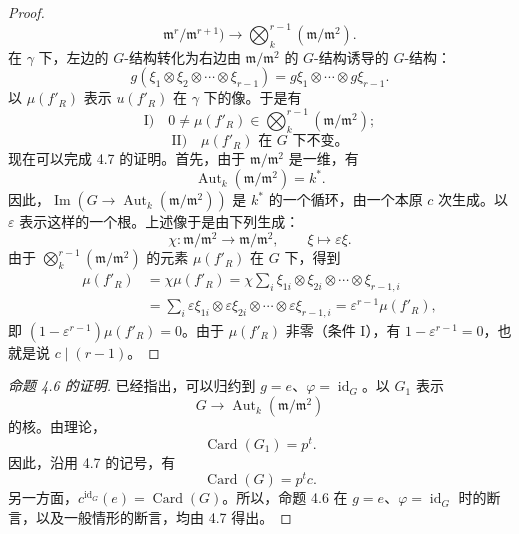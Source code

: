 \begin{proof}
\[ \mathfrak m^r/\mathfrak m^{r+1})
\longrightarrow\bigotimes_k^{r-1}(\mathfrak m/\mathfrak m^2).
\]
在 $\gamma$ 下，左边的 $G$-结构转化为右边由 $\mathfrak m/\mathfrak m^2$ 的 $G$-结构诱导的 $G$-结构：
\[
g(\xi_1\otimes\xi_2\otimes\cdots\otimes\xi_{r-1})
=g\xi_1\otimes\cdots\otimes g\xi_{r-1}.
\]
以 $\mu(f'_R)$ 表示 $u(f'_R)$ 在 $\gamma$ 下的像。于是有
\[
\text{I)}\quad0\ne\mu(f'_R)\in\bigotimes_k^{r-1}(\mathfrak m/\mathfrak m^2);
\]
\[
\text{II)}\quad\mu(f'_R)\text{ 在 }G\text{ 下不变。}
\]
现在可以完成 4.7 的证明。首先，由于 $\mathfrak m/\mathfrak m^2$ 是一维，有
\[
\operatorname{Aut}_k(\mathfrak m/\mathfrak m^2)=k^*.
\]
因此，$\operatorname{Im}(G\longrightarrow\operatorname{Aut}_k(\mathfrak m/\mathfrak m^2))$
是 $k^*$ 的一个循环，由一个本原 $c$ 次生成。以 $\varepsilon$ 表示这样的一个根。上述像于是由下列生成：
\[
\chi:\mathfrak m/\mathfrak m^2\longrightarrow\mathfrak m/\mathfrak m^2,
\qquad\xi\longmapsto\varepsilon\xi.
\]
由于 $\bigotimes_k^{r-1}(\mathfrak m/\mathfrak m^2)$ 的元素 $\mu(f'_R)$ 在 $G$ 下，得到
\[
\begin{aligned}
\mu(f'_R)&=\chi\mu(f'_R)
 =\chi\sum_i\xi_{1i}\otimes\xi_{2i}\otimes\cdots\otimes\xi_{r-1,i}\\
 &=\sum_i\varepsilon\xi_{1i}\otimes\varepsilon\xi_{2i}
   \otimes\cdots\otimes\varepsilon\xi_{r-1,i}
 =\varepsilon^{r-1}\mu(f'_R),
\end{aligned}
\]
即 $(1-\varepsilon^{r-1})\mu(f'_R)=0$。由于 $\mu(f'_R)$ 非零（条件 I），有
$1-\varepsilon^{r-1}=0$，也就是说 $c\mid(r-1)$。
\end{proof}

\begin{proof}[命题 4.6 的证明]
已经指出，可以归约到 $g=e$、$\varphi=\operatorname{id}_G$。以 $G_1$ 表示
\[
G\longrightarrow\operatorname{Aut}_k(\mathfrak m/\mathfrak m^2)
\]
的核。由理论，
\[
\operatorname{Card}(G_1)=p^t.
\]
因此，沿用 4.7 的记号，有
\[
\operatorname{Card}(G)=p^t c.
\]
另一方面，$c^{\operatorname{id}_G}(e)=\operatorname{Card}(G)$。所以，命题 4.6 在 $g=e$、$\varphi=\operatorname{id}_G$ 时的断言，以及一般情形的断言，均由 4.7 得出。
\end{proof}


